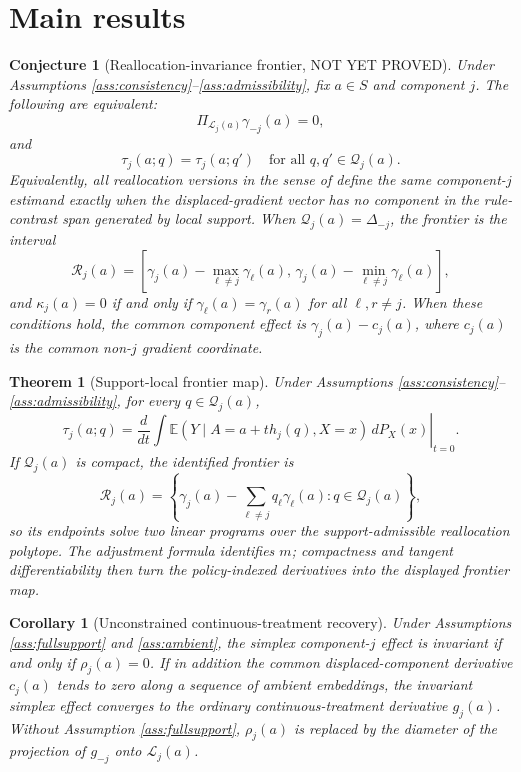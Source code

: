 \documentclass[11pt]{article}
\newcommand{\E}{\mathbb{E}}
\theoremstyle{definition}
\theoremstyle{plain}
\newtheorem{theorem}{Theorem}
\newtheorem{conjecture}{Conjecture}
\newtheorem{corollary}{Corollary}
\theoremstyle{remark}
\begin{document}
\section{Main results}
\begin{conjecture}[Reallocation-invariance frontier, NOT YET PROVED]\label{conj:invariance}
Under Assumptions \ref{ass:consistency}--\ref{ass:admissibility}, fix \(a\in S\) and component \(j\). The following are equivalent:
\[
\Pi_{\mathcal{L}_j(a)}\gamma_{-j}(a)=0,
\]
and
\[
\tau_j(a;q)=\tau_j(a;q')\quad\text{for all }q,q'\in\mathcal{Q}_j(a).
\]
Equivalently, all reallocation versions in the sense of \citet{VanderWeeleHernan2013} define the same component-\(j\) estimand exactly when the displaced-gradient vector has no component in the rule-contrast span generated by local support.
When \(\mathcal{Q}_j(a)=\Delta_{-j}\), the frontier is the interval
\[
\mathcal{R}_j(a)=
\left[\gamma_j(a)-\max_{\ell\neq j}\gamma_\ell(a),\,
\gamma_j(a)-\min_{\ell\neq j}\gamma_\ell(a)\right],
\]
and \(\kappa_j(a)=0\) if and only if \(\gamma_\ell(a)=\gamma_r(a)\) for all \(\ell,r\neq j\). When these conditions hold, the common component effect is \(\gamma_j(a)-c_j(a)\), where \(c_j(a)\) is the common non-\(j\) gradient coordinate.
\end{conjecture}

\begin{theorem}[Support-local frontier map]\label{thm:rulespecific}
Under Assumptions \ref{ass:consistency}--\ref{ass:admissibility}, for every \(q\in\mathcal{Q}_j(a)\),
\[
\tau_j(a;q)=\left.\frac{d}{dt}\int \E(Y\mid A=a+t h_j(q),X=x)\,dP_X(x)\right|_{t=0}.
\]
If \(\mathcal{Q}_j(a)\) is compact, the identified frontier is
\[
\mathcal{R}_j(a)=\left\{\gamma_j(a)-\sum_{\ell\neq j}q_\ell\gamma_\ell(a):q\in\mathcal{Q}_j(a)\right\},
\]
so its endpoints solve two linear programs over the support-admissible reallocation polytope. The adjustment formula identifies \(m\); compactness and tangent differentiability then turn the policy-indexed derivatives into the displayed frontier map.
\end{theorem}

\begin{corollary}[Unconstrained continuous-treatment recovery]\label{cor:ambient}
Under Assumptions \ref{ass:fullsupport} and \ref{ass:ambient}, the simplex component-\(j\) effect is invariant if and only if \(\rho_j(a)=0\). If in addition the common displaced-component derivative \(c_j(a)\) tends to zero along a sequence of ambient embeddings, the invariant simplex effect converges to the ordinary continuous-treatment derivative \(g_j(a)\). Without Assumption \ref{ass:fullsupport}, \(\rho_j(a)\) is replaced by the diameter of the projection of \(g_{-j}\) onto \(\mathcal{L}_j(a)\).
\end{corollary}
\end{document}
